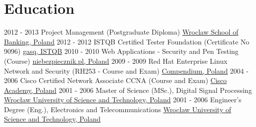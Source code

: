 \documentclass[letterpaper]{tenseconds} %
\begin{document}
\section{Education}
\begin{twenty} %
	\twentyitem
	{2012 - 2013}
	{}
	{Project Management \textnormal{(Postgraduate Diploma)}}
	{\href{https://www.wsb.pl/}{Wroclaw School of Banking, Poland}}
	{}
	{}
	\twentyitem
	{2012 - 2012}
	{}
	{ISTQB Certified Tester Foundation \textnormal{(Certificate No 9096)}}
	{\href{https://www.istqb.org/}{gasq, ISTQB}}
	{}
	{}
	\twentyitem
	{2010 - 2010}
	{}
	{Web Applications - Security and Pen Testing \textnormal{(Course)}}
	{\href{https://www.niebezpiecznik.pl/}{niebezpiecznik.pl, Poland}}
	{}
	{}
	\twentyitem
	{2009 - 2009}
	{}
	{Red Hat Enterprise Linux Network and Security \textnormal{(RH253 - Course and Exam)}}
	{\href{https://www.compendium.pl/}{Compendium, Poland}}
	{}
	{}
	\twentyitem
	{2004 - 2006}
	{}
	{Cisco Certified Network Associate CCNA \textnormal{(Course and Exam)}}
	{\href{https://www.cisco.com/}{Cisco Academy, Poland}}
	{}
	{}
	\twentyitem
	{2001 - 2006}
	{}
	{Master of Science (MSc.), Digital Signal Processing}
	{\href{https://pwr.edu.pl/}{Wrocław University of Science and Technology, Poland}}
	{}
	{}
	\twentyitem
	{2001 - 2006}
	{}
	{Engineer's Degree (Eng.), Electronics and Telecommunications}
	{\href{https://pwr.edu.pl/}{Wrocław University of Science and Technology, Poland}}
	{}
	{}
\end{twenty}
\end{document}

